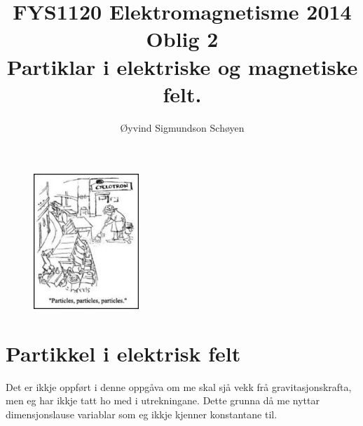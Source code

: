 \documentclass[11pt, a4paper]{article}
\begin{document}
\begin{titlepage}
  
  \title{\normalsize FYS1120 Elektromagnetisme 2014\\
  \vspace{10mm}
  \huge Oblig 2\\
  \vspace{10mm}
  \normalsize{\bf Partiklar i elektriske og magnetiske felt.}}

  \author{Øyvind Sigmundson Schøyen}

\end{titlepage}

\maketitle

\begin{figure}[H]
  \centering
  \includegraphics[width=150px]{cyclotron.jpg}
\end{figure}

\newpage
  \tableofcontents
\newpage

\section{Partikkel i elektrisk felt}
  Det er ikkje oppført i denne oppgåva om me skal sjå vekk frå gravitasjonskrafta, men eg har ikkje tatt ho med i utrekningane. Dette grunna då me nyttar dimensjonslause variablar som eg 
  ikkje kjenner konstantane til.
\end{document}
